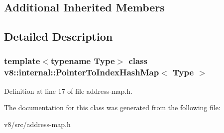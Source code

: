 \subsection*{Additional Inherited Members}


\subsection{Detailed Description}
\subsubsection*{template$<$typename Type$>$\newline
class v8\+::internal\+::\+Pointer\+To\+Index\+Hash\+Map$<$ Type $>$}



Definition at line 17 of file address-\/map.\+h.



The documentation for this class was generated from the following file\+:\begin{DoxyCompactItemize}
\item 
v8/src/address-\/map.\+h\end{DoxyCompactItemize}
